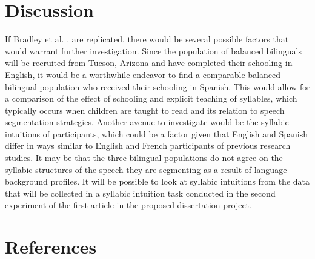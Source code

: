 \documentclass[
12pt, %
english, %
doublespacing, %
nolistspacing, %
liststotoc, %
headsepline, %
chapterinoneline, %
openany, %
]{DoctoralThesis}\usepackage[]{graphicx}\usepackage[]{color}
\begin{document}

\section{Discussion}

If Bradley et al. \parencite{Bradley1993-qq}. are replicated, there would be several possible factors that would warrant further investigation. Since the population of balanced bilinguals will be recruited from Tucson, Arizona and have completed their schooling in English, it would be a worthwhile endeavor to find a comparable balanced bilingual population who received their schooling in Spanish. This would allow for a comparison of the effect of schooling and explicit teaching of syllables, which typically occurs when children are taught to read and its relation to speech segmentation strategies. 
Another avenue to investigate would be the syllabic intuitions of participants, which could be a factor given that English and Spanish differ in ways similar to English and French participants of previous research studies. It may be that the three bilingual populations do not agree on the syllabic structures of the speech they are segmenting as a result of language background profiles. It will be possible to look at syllabic intuitions from the data that will be collected in a syllabic intuition task conducted in the second experiment of the first article in the proposed dissertation project. 



\section{References}
\end{document}

